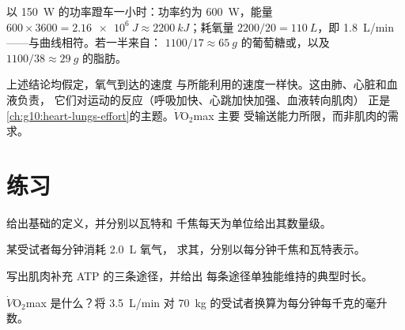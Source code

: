 \begin{example}[骑车一小时]\label{ex:g10:exercise-and-energy:hour}
以 \qty{150}{W} 的功率蹬车一小时：功率约为
\qty{600}{W}，能量 $600 \times 3600 = \qty{2.16e6}{J} \approx
\qty{2200}{kJ}$；耗氧量 $2200/20 = \qty{110}{L}$，即 \qty{1.8}{L/min}
——与曲线相符。若一半来自：
$1100/17 \approx \qty{65}{g}$ 的葡萄糖或，以及
$1100/38 \approx \qty{29}{g}$ 的脂肪。
\end{example}

\begin{remark}[为何氧气必须送达]\label{rem:g10:exercise-and-energy:delivery}
上述结论均假定，氧气到达的速度
与所能利用的速度一样快。这由肺、心脏和血液负责，
它们对运动的反应（呼吸加快、心跳加快加强、血液转向肌肉）
正是
\cref{ch:g10:heart-lungs-effort}的主题。$\dot V\!\mathrm{O_2}$max 主要
受输送能力所限，而非肌肉的需求。
\end{remark}

\section{练习}

\begin{exercise}[$\star$]\label{exo:g10:exercise-and-energy:1}
给出基础的定义，并分别以瓦特和
千焦每天为单位给出其数量级。
\end{exercise}

\begin{exercise}[$\star$]\label{exo:g10:exercise-and-energy:2}
某受试者每分钟消耗 \qty{2.0}{L} 氧气，
求其，分别以每分钟千焦和瓦特表示。
\end{exercise}

\begin{exercise}[$\star$]\label{exo:g10:exercise-and-energy:3}
写出肌肉补充 ATP 的三条途径，并给出
每条途径单独能维持的典型时长。
\end{exercise}

\begin{exercise}[$\star$]\label{exo:g10:exercise-and-energy:4}
$\dot V\!\mathrm{O_2}$max 是什么？将 \qty{3.5}{L/min} 对
\qty{70}{kg} 的受试者换算为每分钟每千克的毫升数。
\end{exercise}

